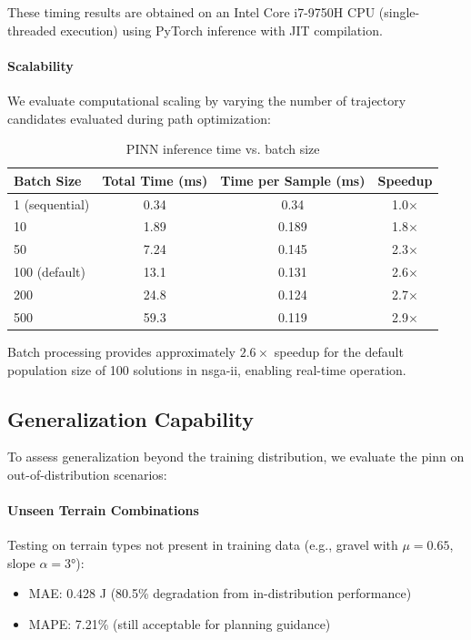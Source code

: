 These timing results are obtained on an Intel Core i7-9750H CPU (single-threaded execution) using PyTorch inference with JIT compilation.


\paragraph{Scalability}
We evaluate computational scaling by varying the number of trajectory candidates evaluated during path optimization:

\begin{table}[htbp]
\centering
\caption{PINN inference time vs. batch size}
\label{tab:pinn_scalability}
\begin{tabular}{lccc}
\toprule
\textbf{Batch Size} & \textbf{Total Time (ms)} & \textbf{Time per Sample (ms)} & \textbf{Speedup} \\
\midrule
1 (sequential) & 0.34 & 0.34 & 1.0$\times$ \\
10 & 1.89 & 0.189 & 1.8$\times$ \\
50 & 7.24 & 0.145 & 2.3$\times$ \\
100 (default) & 13.1 & 0.131 & 2.6$\times$ \\
200 & 24.8 & 0.124 & 2.7$\times$ \\
500 & 59.3 & 0.119 & 2.9$\times$ \\
\bottomrule
\end{tabular}
\end{table}

Batch processing provides approximately $2.6\times$ speedup for the default population size of 100 solutions in \acrshort{nsga-ii}, enabling real-time operation.

\subsection{Generalization Capability}

To assess generalization beyond the training distribution, we evaluate the \acrshort{pinn} on out-of-distribution scenarios:

\paragraph{Unseen Terrain Combinations}
Testing on terrain types not present in training data (e.g., gravel with $\mu = 0.65$, slope $\alpha = 3°$):
\begin{itemize}
    \item MAE: 0.428 J (80.5\% degradation from in-distribution performance)
    \item MAPE: 7.21\% (still acceptable for planning guidance)
\end{itemize}

